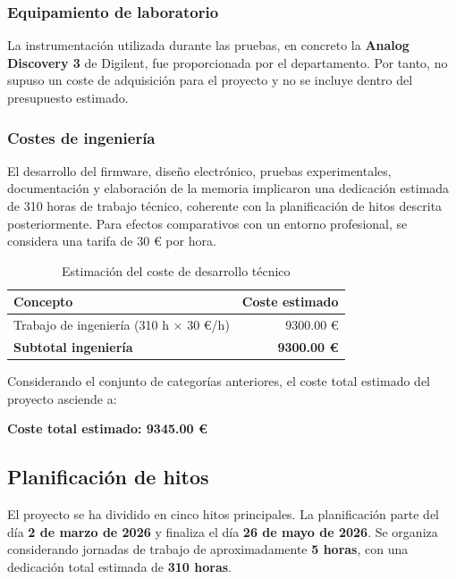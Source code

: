 \documentclass[11pt,a4paper]{article}
\begin{document}
\subsubsection*{Equipamiento de laboratorio}

La instrumentación utilizada durante las pruebas, en concreto la \textbf{Analog Discovery 3} de Digilent, fue proporcionada por el departamento. Por tanto, no supuso un coste de adquisición para el proyecto y no se incluye dentro del presupuesto estimado.

\subsubsection*{Costes de ingeniería}

El desarrollo del firmware, diseño electrónico, pruebas experimentales, documentación y elaboración de la memoria implicaron una dedicación estimada de 310 horas de trabajo técnico, coherente con la planificación de hitos descrita posteriormente. Para efectos comparativos con un entorno profesional, se considera una tarifa de 30 € por hora.

\begin{table}[H]
    \centering
    \begin{tabular}{|l|r|}
        \hline
        \textbf{Concepto} & \textbf{Coste estimado} \\ \hline
        Trabajo de ingeniería (310 h $\times$ 30 €/h) & 9300.00 € \\ \hline
        \textbf{Subtotal ingeniería} & \textbf{9300.00 €} \\ \hline
    \end{tabular}
    \caption{Estimación del coste de desarrollo técnico}
\end{table}


\bigskip

Considerando el conjunto de categorías anteriores, el coste total estimado del proyecto asciende a:

\begin{center}
\textbf{Coste total estimado: 9345.00 €}
\end{center}


\subsection{Planificación de hitos}

El proyecto se ha dividido en cinco hitos principales. La planificación parte del día \textbf{2 de marzo de 2026} y finaliza el día \textbf{26 de mayo de 2026}. Se organiza considerando jornadas de trabajo de aproximadamente \textbf{5 horas}, con una dedicación total estimada de \textbf{310 horas}.
\end{document}
